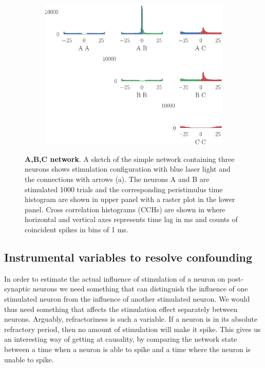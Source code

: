 \documentclass[11pt]{article}
\begin{document}
\begin{figure}
\medskip
\begin{subfigure}{\textwidth}\centering \includegraphics[scale=1]{xcorr}
\caption{} \label{fig:intro:3}
\end{subfigure}
\caption{{\bf A,B,C network}. A sketch of the simple network containing three neurons %
shows stimulation configuration with blue laser light and the connections with arrows (a). The neurons A and B are stimulated 1000 trials and the corresponding peristimulus time histogram are shown in  upper panel with a raster plot in the lower panel. Cross correlation histograms (CCHs) are shown in  where horizontal and vertical axes represents time lag in ms and counts of coincident spikes in bins of 1 ms. \label{fig:intro}}
\end{figure}

\subsection{Instrumental variables to resolve confounding}
In order to estimate the actual influence of stimulation of a neuron on post-synaptic neurons we need something that can distinguish the influence of one stimulated neuron from the influence of another stimulated neuron. We would thus need something that affects the stimulation effect separately between neurons. Arguably, refractoriness is such a variable. If a neuron is in its absolute refractory period, then no amount of stimulation will make it spike. This gives us an interesting way of getting at causality, by comparing the network state between a time when a neuron is able to spike and a time where the neuron is unable to spike.
\end{document}
